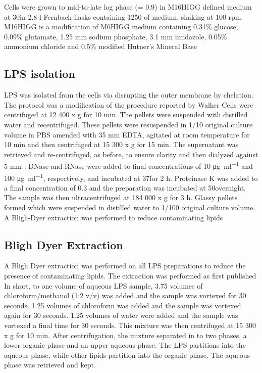 		Cells were grown to mid-to-late log phase (\od = 0.9) in M16HIGG defined medium at 30\cel in 2.8 \si{\litre} Fernbach flasks containing 1250 \millilitre of medium, shaking at 100 rpm. M16HIGG is a modification of M6HIGG medium containing 0.31\% glucose, 0.09\% glutamate, 1.25 \si{\milli\meter} sodium phosphate, 3.1 \si{\milli\meter} imidazole, 0.05\% ammonium chloride and 0.5\% modified Hutner's Mineral Base 

	\subsection{\textsc{LPS} isolation} %
	\label{sub:LPS_isolation}

		\ac{LPS} was isolated from the cells via disrupting the outer membrane by chelation. The protocol was a modification of the procedure reported by Walker \etal{} Cells were centrifuged at 12 400 x g for 10 min. The pellets were suspended with distilled water and recentrifuged. These pellets were resuspended in 1/10 original culture volume in \ac{PBS} amended with 35 \si{\milli\meter} \ac{EDTA}, agitated at room temperature for 10 min and then centrifuged at 15 300 x g for 15 min. The supernatant was retrieved and re-centrifuged, as before, to ensure clarity and then dialyzed against 5 \si{\milli\meter} . DNase and RNase were added to final concentrations of 10 \si{\micro\gram\per\milli\litre} and 100 \si{\micro\gram\per\milli\litre}, respectively, and incubated at 37\cel for 2 h. Proteinase K was added to a final concentration of 0.3 \mgperml and the preparation was incubated at 50\cel overnight. The sample was then ultracentrifuged at 184 000 x g for 3 h. Glassy pellets formed which were suspended in distilled water to 1/100 original culture volume. A Bligh-Dyer extraction was performed to reduce contaminating lipids

	\subsection{Bligh Dyer Extraction} %
	\label{sub:bligh_dyer_extraction}
		A Bligh Dyer extraction was performed on all \ac{LPS} preparations to reduce the presence of contaminating lipids. The extraction was performed as first published In short,  to one volume of aqueous \ac{LPS} sample, 3.75 volumes of chloroform/methanol (1:2 v/v) was added and the sample was vortexed for 30 seconds. 1.25 volumes of chloroform was added and the sample was vortexed again for 30 seconds. 1.25 volumes of water were added and the sample was vortexed a final time for 30 seconds. This mixture was then centrifuged at 15 300 x g for 10 min. After centrifugation, the mixture separated in to two phases, a lower organic phase and an upper aqueous phase. The \ac{LPS} partitions into the aqueous phase, while other lipids partition into the organic phase. The aqueous phase was retrieved and kept.

